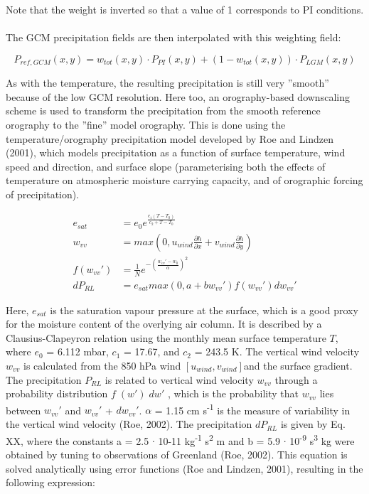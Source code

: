 \documentclass{article}
\begin{document}
Note that the weight is inverted so that a value of 1 corresponds to PI conditions.\\
\\
The GCM precipitation fields are then interpolated with this weighting field:

\begin{equation}
P_{ref,GCM} (x,y) = w_{tot} (x,y) \cdot P_{PI} (x,y) + \left( 1 - w_{tot} (x,y) \right) \cdot P_{LGM} (x,y)
\end{equation}

As with the temperature, the resulting precipitation is still very ''smooth'' because of the low GCM resolution. Here too, an orography-based downscaling scheme is used to transform the precipitation from the smooth reference orography to the ''fine'' model orography. This is done using the temperature/orography precipitation model developed by Roe and Lindzen (2001), which models precipitation as a function of surface temperature, wind speed and direction, and surface slope (parameterising both the effects of temperature on atmospheric moisture carrying capacity, and of orographic forcing of precipitation).

\begin{align}
e_{sat} &= e_0 e^{\frac{c_1 (T - T_0)}{c_2 + T - T_0}} \\
w_{vv} &= max(0, u_{wind} \frac{\partial h}{\partial x} + v_{wind} \frac{\partial h}{\partial y}) \\
f( w_{vv}') &= \frac{1}{N} e^{-{\left( \frac{w_{vv}' - w_0}{\alpha} \right)}^2}\\
dP_{RL} &= e_{sat} max(0, a+b w_{vv}') f( w_{vv}') dw_{vv}'
\end{align}

Here, $e_{sat}$ is the saturation vapour pressure at the surface, which is a good proxy for the moisture content of the overlying air column. It is described by a Clausius-Clapeyron relation using the monthly mean surface temperature $T$, where $e_0$ = 6.112 mbar, $c_1$ = 17.67, and $c_2$ = 243.5 K. The vertical wind velocity $w_{vv}$ is calculated from the 850 hPa wind $[u_{wind},v_{wind}]$and the surface gradient. The precipitation $P_{RL}$ is related to vertical wind velocity $w_{vv}$ through a probability distribution $f 􏰁(w') 􏰂dw'$ , which is the probability that $w_{vv}$ lies between $w_{vv}'$ and $w_{vv}'$ + $dw_{vv}'$. $\alpha$ = 1.15 cm s\textsuperscript{-1} is the measure of variability in the vertical wind velocity (Roe, 2002). The precipitation $dP_{RL}$ is given by Eq. XX, where the constants a = 2.5 $\cdot$ 10-11 kg\textsuperscript{-1} s\textsuperscript{2} m and b = 5.9 $\cdot$ 10\textsuperscript{-9} s\textsuperscript{3} kg were obtained by tuning to observations of Greenland (Roe, 2002). This equation is solved analytically using error functions (Roe and Lindzen, 2001), resulting in the following expression:
\end{document}
